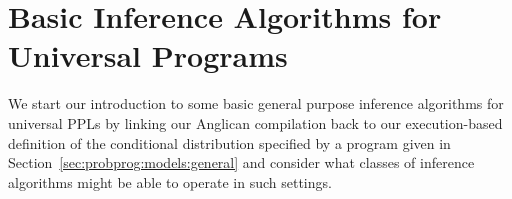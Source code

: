 
\section{Basic Inference Algorithms for Universal Programs}
\label{sec:proginf:inf}

We start our introduction to some basic general purpose inference algorithms for
universal PPLs by linking our Anglican compilation back to our execution-based 
definition of the conditional distribution specified by a program given in 
Section~\ref{sec:probprog:models:general} and consider what classes of inference
algorithms might be able to operate in such settings.